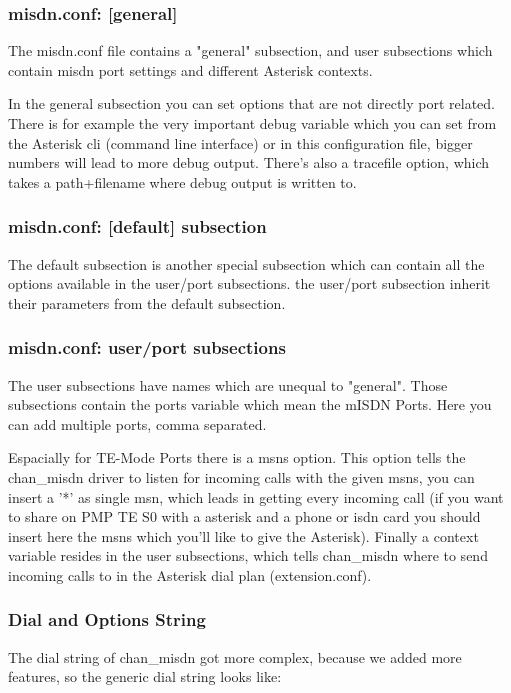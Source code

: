 \subsubsection{misdn.conf: [general]}
The misdn.conf file contains a "general" subsection, and user subsections which
contain misdn port settings and different Asterisk contexts.

In the general subsection you can set options that are not directly port
related. There is for example the very important debug variable which you can
set from the Asterisk cli (command line interface) or in this configuration
file, bigger numbers will lead to more debug output. There's also a tracefile
option, which takes a path+filename where debug output is written to.

\subsubsection{misdn.conf: [default] subsection}

The default subsection is another special subsection which can contain all the
options available in the user/port subsections. the user/port subsection inherit
their parameters from the default subsection.

\subsubsection{misdn.conf: user/port subsections}

The user subsections have names which are unequal to "general". Those subsections
contain the ports variable which mean the mISDN Ports. Here you can add
multiple ports, comma separated.

Espacially for TE-Mode Ports there is a msns option. This option tells the
chan\_misdn driver to listen for incoming calls with the given msns, you can
insert a '*' as single msn, which leads in getting every incoming call (if you
want to share on PMP TE S0 with a asterisk and a phone or isdn card you should
insert here the msns which you'll like to give the Asterisk).  Finally a
context variable resides in the user subsections, which tells chan\_misdn where to
send incoming calls to in the Asterisk dial plan (extension.conf).


\subsubsection{Dial and Options String}

The dial string of chan\_misdn got more complex, because we added more features,
so the generic dial string looks like:

